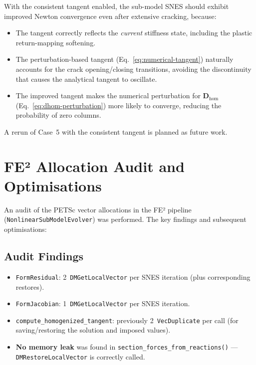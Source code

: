 With the consistent tangent enabled, the sub-model SNES should
exhibit improved Newton convergence even after extensive cracking,
because:
\begin{itemize}
  \item The tangent correctly reflects the \emph{current} stiffness
    state, including the plastic return-mapping softening.
  \item The perturbation-based tangent
    (Eq.~\ref{eq:numerical-tangent}) naturally accounts for the
    crack opening/closing transitions, avoiding the discontinuity
    that causes the analytical tangent to oscillate.
  \item The improved tangent makes the numerical perturbation for
    $\mathbf{D}_{\text{hom}}$ (Eq.~\ref{eq:dhom-perturbation})
    more likely to converge, reducing the probability of zero columns.
\end{itemize}

A rerun of Case~5 with the consistent tangent is planned as future
work.


\section{FE² Allocation Audit and Optimisations}
\label{sec:fe2-alloc-audit}

An audit of the PETSc vector allocations in the FE² pipeline
(\texttt{NonlinearSubModelEvolver}) was performed.  The key findings
and subsequent optimisations:

\subsection{Audit Findings}

\begin{itemize}
  \item \texttt{FormResidual}: 2~\texttt{DMGetLocalVector} per SNES
    iteration (plus corresponding restores).
  \item \texttt{FormJacobian}: 1~\texttt{DMGetLocalVector} per SNES
    iteration.
  \item \texttt{compute\_homogenized\_tangent}: previously
    2~\texttt{VecDuplicate} per call (for saving/restoring the
    solution and imposed values).
  \item \textbf{No memory leak} was found in
    \texttt{section\_forces\_from\_reactions()} ---
    \texttt{DMRestoreLocalVector} is correctly called.
\end{itemize}

